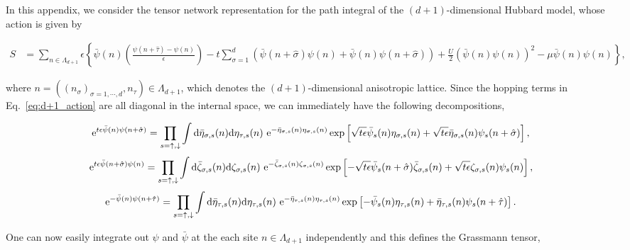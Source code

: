 \documentclass[nofootinbib,prd,aps,superscriptaddress,preprintnumbers,twocolumn,showpacs]{revtex4-1}
\begin{document}
In this appendix, we consider the tensor network representation for the path integral of the $(d+1)$-dimensional Hubbard model, whose action is given by
\begin{widetext}
\begin{align}
\label{eq:d+1_action}
        S&=\sum_{n\in\Lambda_{d+1}}\epsilon\left\{\bar{\psi}(n)\left(\frac{\psi(n+{\hat \tau})-\psi(n)}{\epsilon}\right)-t\sum_{\sigma=1}^{d}\left(\bar{\psi}(n+{\hat\sigma})\psi(n)+\bar{\psi}(n)\psi(n+{\hat\sigma})\right)
         +\frac{U}{2}\left(\bar{\psi}(n)\psi(n)\right)^2-\mu\bar{\psi}(n)\psi(n)\right\},
\end{align}
\end{widetext}
where $n=((n_{\sigma})_{\sigma=1,\cdots,d},n_{\tau})\in\Lambda_{d+1}$, which denotes the $(d+1)$-dimensional anisotropic lattice.
Since the hopping terms in Eq.~\eqref{eq:d+1_action} are all diagonal in the internal space, we can immediately have the following decompositions,
\begin{widetext}
\begin{align}
\label{eq:i_sigma}
	{\rm e}^{t\epsilon\bar{\psi}(n)\psi(n+\hat{\sigma})}=\prod_{s=\uparrow,\downarrow}\int{\rm d}\bar{\eta}_{\sigma,s}(n){\rm d}\eta_{\tau,s}(n)~{\rm e}^{-\bar{\eta}_{\sigma,s}(n)\eta_{\sigma,s}(n)}\exp\left[\sqrt{t\epsilon}\bar{\psi}_{s}(n)\eta_{\sigma,s}(n)+\sqrt{t\epsilon}\bar{\eta}_{\sigma,s}(n)\psi_{s}(n+\hat{\sigma})\right],
\end{align}
\begin{align}
\label{eq:j_sigma}
	{\rm e}^{t\epsilon\bar{\psi}(n+\hat{\sigma})\psi(n)}=\prod_{s=\uparrow,\downarrow}\int{\rm d}\bar{\zeta}_{\sigma,s}(n){\rm d}\zeta_{\sigma,s}(n)~{\rm e}^{-\bar{\zeta}_{\sigma,s}(n)\zeta_{\sigma,s}(n)}\exp\left[-\sqrt{t\epsilon}\bar{\psi}_{s}(n+\hat{\sigma})\bar{\zeta}_{\sigma,s}(n)+\sqrt{t\epsilon}\zeta_{\sigma,s}(n)\psi_{s}(n)\right],
\end{align}
\begin{align}
\label{eq:i_tau}
	{\rm e}^{-\bar{\psi}(n)\psi(n+\hat{\tau})}=\prod_{s=\uparrow,\downarrow}\int{\rm d}\bar{\eta}_{\tau,s}(n){\rm d}\eta_{\tau,s}(n)~{\rm e}^{-\bar{\eta}_{\tau,s}(n)\eta_{\tau,s}(n)}\exp\left[-\bar{\psi}_{s}(n)\eta_{\tau,s}(n)+\bar{\eta}_{\tau,s}(n)\psi_{s}(n+\hat{\tau})\right].
\end{align}
\end{widetext}
One can now easily integrate out $\psi$ and $\bar{\psi}$ at the each site $n\in\Lambda_{d+1}$ independently and this defines the Grassmann tensor,
\end{document}
